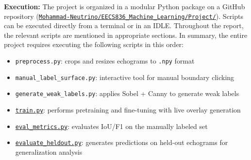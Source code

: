 \documentclass[11pt,oneside,openany]{article}
\begin{document}
\textbf{Execution:} The project is organized in a modular Python package on a GitHub repository (\texttt{\href{https://github.com/Mohammad-Neutrino/EECS836_Machine_Learning.git}{Mohammad-Neutrino/EECS836\_Machine\_Learning/Project/}}). Scripts can be executed directly from a terminal or in an IDLE. Throughout the report, the relevant scripts are mentioned in appropriate sections. In summary, the entire project requires executing the following scripts in this order:
\begin{itemize}[leftmargin=*]
  \item \texttt{preprocess.py}: crops and resizes echograms to \texttt{.npy} format
  \item \texttt{manual\_label\_surface.py}: interactive tool for manual boundary clicking
  \item \texttt{generate\_weak\_labels.py}: applies Sobel + Canny to generate weak labels
  \item \texttt{\href{https://github.com/Mohammad-Neutrino/EECS836_Machine_Learning/blob/trunk/Project/src/train.py}{train.py}}: performs pretraining and fine-tuning with live overlay generation
  \item \texttt{\href{https://github.com/Mohammad-Neutrino/EECS836_Machine_Learning/blob/trunk/Project/src/eval_metrics.py}{eval\_metrics.py}}: evaluates IoU/F1 on the manually labeled set
  \item \texttt{\href{https://github.com/Mohammad-Neutrino/EECS836_Machine_Learning/blob/trunk/Project/src/evaluate_heldout.py}{evaluate\_heldout.py}}: generates predictions on held-out echograms for generalization analysis
\end{itemize}
\end{document}
